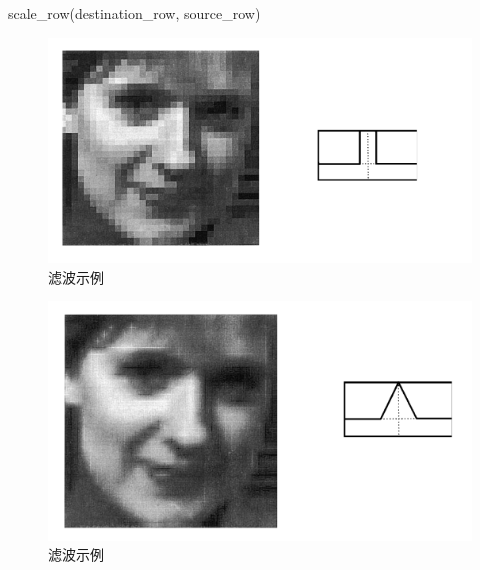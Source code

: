 \begin{CJK}{UTF8}{gbsn}
\begin{algorithm}
	 
	 
	
	
 	 	  \caption{scale\_row(destination\_row, source\_row)}
 	 	  \label{algo:scale_row} 
 	 \end{algorithm}
\DecMargin{1em} 


\begin{figure}[htbp]%
  \centering
  \includegraphics[totalheight=2in]{./fig/1.2.4.png}
  \caption{滤波示例} 
  \label{fig:sinc4}
\end{figure}

\begin{figure}[htbp]%
  \centering
  \includegraphics[totalheight=2in]{./fig/1.2.5.png}
  \caption{滤波示例} 
  \label{fig:sinc5}
\end{figure}


\end{CJK}

